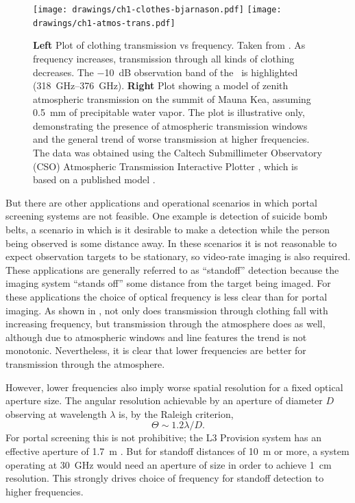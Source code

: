 \begin{figure}
\centering
\texttt{[image: drawings/ch1-clothes-bjarnason.pdf]}
\texttt{[image: drawings/ch1-atmos-trans.pdf]}
\caption[Clothing and Atmospheric Transmission vs Frequency]{
  \textbf{Left}
  Plot of clothing transmission vs frequency.
  Taken from \cite{bjarnason_millimeter-wave_2004}.
  As frequency increases, transmission through all kinds of clothing decreases.
  The \SI{-10}{\dB} observation band of the \Imager\ is highlighted (\SIrange{318}{376}{\GHz}).
  \textbf{Right}
  Plot showing a model of zenith atmospheric transmission on the summit of Mauna Kea, assuming \SI{0.5}{\mm} of precipitable water vapor.
  The plot is illustrative only, demonstrating the presence of atmospheric transmission windows and the general trend of worse transmission at higher frequencies.
  The data was obtained using the Caltech Submillimeter Observatory (CSO) Atmospheric Transmission Interactive Plotter \cite{darek_lis_cso_????}, which is based on a published model \cite{pardo_atmospheric_2001}.
}
\label{fig:ch1-clothes-atmos-trans}
\end{figure}

But there are other applications and operational scenarios in which portal screening systems are not feasible.
One example is detection of suicide bomb belts, a scenario in which is it desirable to make a detection while the person being observed is some distance away.
In these scenarios it is not reasonable to expect observation targets to be stationary, so video-rate imaging is also required.
These applications are generally referred to as ``standoff'' detection because the imaging system ``stands off'' some distance from the target being imaged.
For these applications the choice of optical frequency is less clear than for portal imaging.
As shown in , not only does transmission through clothing fall with increasing frequency, but transmission through the atmosphere does as well, although due to atmospheric windows and line features the trend is not monotonic.
Nevertheless, it is clear that lower frequencies are better for transmission through the atmosphere.

However, lower frequencies also imply worse spatial resolution for a fixed optical aperture size.
The angular resolution achievable by an aperture of diameter $D$ observing at wavelength $\lambda$ is, by the Raleigh criterion,
\begin{equation} \label{eqn:ch1-raleigh}
  \Theta \sim 1.2 \lambda / D.
\end{equation}
For portal screening this is not prohibitive; the L3 Provision system has an effective aperture of \SI{1.7}{\m} \cite{mcmakin_dual-surface_2009}.
But for standoff distances of \SI{10}{\m} or more, a system operating at \SI{30}{\GHz} would need an aperture of size  in order to achieve \SI{1}{\cm} resolution.
This strongly drives choice of frequency for standoff detection to higher frequencies.

